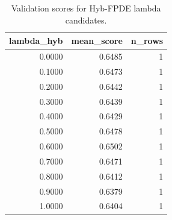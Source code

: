 \begin{table}[t]
\caption{Validation scores for Hyb-FPDE lambda candidates.}
\label{tab:lambda_distribution_computed}
\centering
\begin{tabular}{rrr}
\toprule
lambda\_hyb & mean\_score & n\_rows \\
\midrule
0.0000 & 0.6485 & 1 \\
0.1000 & 0.6473 & 1 \\
0.2000 & 0.6442 & 1 \\
0.3000 & 0.6439 & 1 \\
0.4000 & 0.6429 & 1 \\
0.5000 & 0.6478 & 1 \\
0.6000 & 0.6502 & 1 \\
0.7000 & 0.6471 & 1 \\
0.8000 & 0.6412 & 1 \\
0.9000 & 0.6379 & 1 \\
1.0000 & 0.6404 & 1 \\
\bottomrule
\end{tabular}

\end{table}
